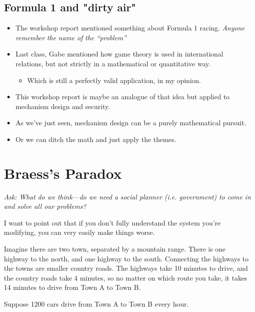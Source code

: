 \documentclass[11pt]{article}
\begin{document}
\subsection{Formula 1 and "dirty air"}

\begin{itemize}
    \item The workshop report mentioned something about Formula 1 racing. {\it Anyone remember the name of the ``problem''}
    \item Last class, Gabe mentioned how game theory is used in international relations, but not strictly in a mathematical or quantitative way. 
    \begin{itemize}
        \item Which is still a perfectly valid application, in my opinion. 
    \end{itemize}
    \item This workshop report is maybe an analogue of that idea but applied to mechanism design and security.
    \item As we've just seen, mechanism design can be a purely mathematical pursuit.
    \item Or we can ditch the math and just apply the themes. 
\end{itemize}

\section{Braess's Paradox}

{\it Ask: What do we think---do we need a social planner (i.e. government) to come in and solve all our problems?}

I want to point out that if you don't fully understand the system you're modifying, you can very easily make things worse. 

Imagine there are two town, separated by a mountain range. There is one highway to the north, and one highway to the south. 
Connecting the highways to the towns are smaller country roads.  
The highways take 10 minutes to drive, and the country roads take 4 minutes, so no matter on which route you take, it takes 14 minutes to drive from Town A to Town B.

Suppose 1200 cars drive from Town A to Town B every hour. 
\end{document}
